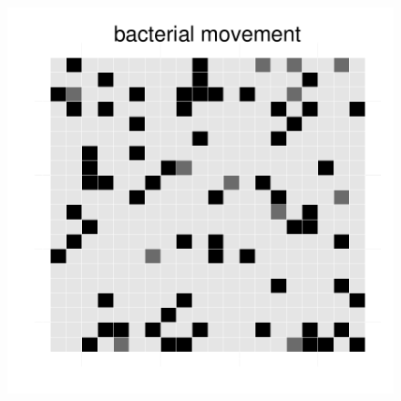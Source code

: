 \begin{figure}[h]
{\begin{minipage}[t]{0.3\textwidth}
  \end{minipage}
  \begin{minipage}[t]{0.3\textwidth}
    \includegraphics[width=\textwidth]{../results/barkeri_ecoli_20x20_seed4612_bac150.pdf}
  \end{minipage}
  }
\end{figure}
